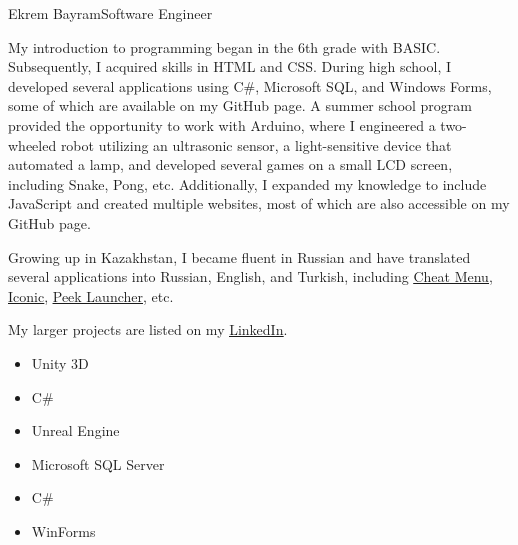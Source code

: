 \documentclass{article}
\begin{document}
\begin{cv}[avatar]{Ekrem Bayram}{Software Engineer}



    My introduction to programming began in the 6th grade with BASIC. Subsequently, I acquired skills in HTML and CSS. During high school, I developed several applications using C\#, Microsoft SQL, and Windows Forms, some of which are available on my GitHub page. A summer school program provided the opportunity to work with Arduino, where I engineered a two-wheeled robot utilizing an ultrasonic sensor, a light-sensitive device that automated a lamp, and developed several games on a small LCD screen, including Snake, Pong, etc. Additionally, I expanded my knowledge to include JavaScript and created multiple websites, most of which are also accessible on my GitHub page.

    Growing up in Kazakhstan, I became fluent in Russian and have translated several applications into Russian, English, and Turkish, including \href{https://www.github.com/user-grinch/Cheat-Menu}{\uline{Cheat Menu}}, \href{https://www.play.google.com/store/apps/details?id=xeus.iconic}{\uline{Iconic}}, \href{https://www.polkuijken.medium.com/case-study-peek-launcher-220f0e505d51}{\uline{Peek Launcher}}, etc.

    My larger projects are listed on my \href{https://www.linkedin.com/in/ekrem-qb/details/projects}{\uline{LinkedIn}}.


    \begin{cvevent}[2020][present]
        \begin{itemize}
            \item Unity 3D
            \item C\#
            \item Unreal Engine
        \end{itemize}
    \end{cvevent}

    \cvseparator[2]
    \begin{cvevent}[2019][2020]
        \begin{itemize}
            \item Microsoft SQL Server
            \item C\#
            \item WinForms
        \end{itemize}
    \end{cvevent}



\end{cv}
\end{document}
